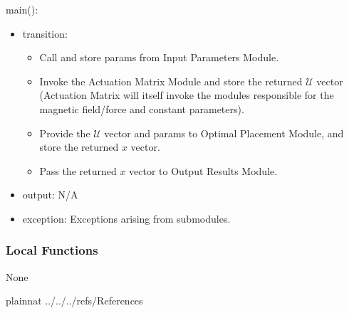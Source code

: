 \documentclass[12pt, titlepage]{article}
\begin{document}
\noindent main():
\begin{itemize}
\item transition: 
\begin{itemize}
  \item Call and store params from Input Parameters Module. 
  \item Invoke the Actuation Matrix Module and store the returned $\mathcal{U}$ vector (Actuation Matrix will itself invoke the modules responsible for the magnetic field/force and constant parameters).
  \item Provide the $\mathcal{U}$ vector and params to Optimal Placement Module, and store the returned $x$ vector. 
  \item Pass the returned $x$ vector to Output Results Module. 
\end{itemize}
\item output: N/A
\item exception: Exceptions arising from submodules.
\end{itemize}


\subsubsection{Local Functions}
None

\newpage

 {plainnat}
 {../../../refs/References}
\end{document}
